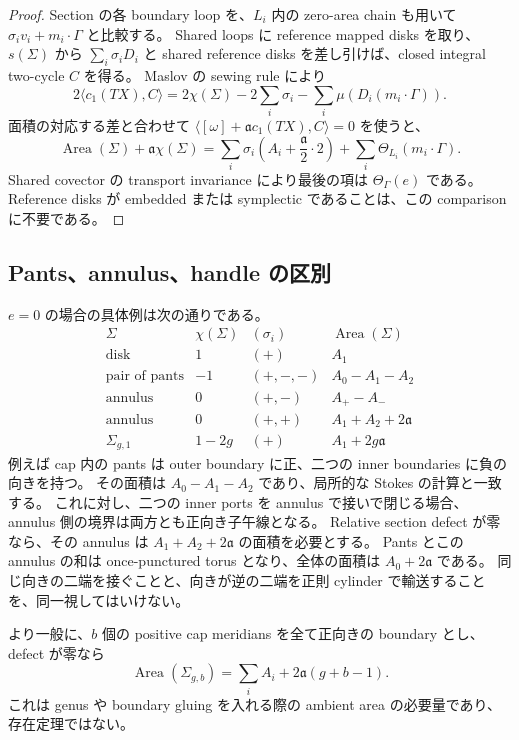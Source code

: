 \begin{proof}
Section の各 boundary loop を、$L_i$ 内の zero-area chain も用いて
$\sigma_i v_i+m_i\cdot\Gamma$ と比較する。
Shared loops に reference mapped disks を取り、$s(\Sigma)$ から
$\sum_i\sigma_iD_i$ と shared reference disks を差し引けば、closed integral two-cycle $C$ を得る。
Maslov の sewing rule により
\[
 2\langle c_1(TX),C\rangle
 =2\chi(\Sigma)-2\sum_i\sigma_i-\sum_i\mu(D_i(m_i\cdot\Gamma)).
\]
面積の対応する差と合わせて
$\langle[\omega]+\mathfrak a c_1(TX),C\rangle=0$ を使うと、
\[
 \operatorname{Area}(\Sigma)+\mathfrak a\chi(\Sigma)
 =\sum_i\sigma_i\left(A_i+\frac{\mathfrak a}{2}\cdot2\right)
  +\sum_i\Theta_{L_i}(m_i\cdot\Gamma).
\]
Shared covector の transport invariance により最後の項は $\Theta_\Gamma(e)$ である。
Reference disks が embedded または symplectic であることは、この comparison に不要である。
\end{proof}

\subsection{Pants、annulus、handle の区別}

$e=0$ の場合の具体例は次の通りである。
\[
\begin{array}{c|c|c|c}
 \Sigma&\chi(\Sigma)&(\sigma_i)&\operatorname{Area}(\Sigma)\\\hline
 \text{disk}&1&(+) &A_1\\
 \text{pair of pants}&-1 &(+,-,-)&A_0-A_1-A_2\\
 \text{annulus}&0 &(+,-)&A_+-A_-\\
 \text{annulus}&0 &(+,+)&A_1+A_2+2\mathfrak a\\
 \Sigma_{g,1}&1-2g &(+)&A_1+2g\mathfrak a
\end{array}
\]
例えば cap 内の pants は outer boundary に正、二つの inner boundaries に負の向きを持つ。
その面積は $A_0-A_1-A_2$ であり、局所的な Stokes の計算と一致する。
これに対し、二つの inner ports を annulus で接いで閉じる場合、
annulus 側の境界は両方とも正向き子午線となる。
Relative section defect が零なら、その annulus は $A_1+A_2+2\mathfrak a$ の面積を必要とする。
Pants とこの annulus の和は once-punctured torus となり、全体の面積は $A_0+2\mathfrak a$ である。
同じ向きの二端を接ぐことと、向きが逆の二端を正則 cylinder で輸送することを、同一視してはいけない。

より一般に、$b$ 個の positive cap meridians を全て正向きの boundary とし、
defect が零なら
\begin{equation}\label{rsb:all-positive}
 \operatorname{Area}(\Sigma_{g,b})=\sum_i A_i+2\mathfrak a(g+b-1).
\end{equation}
これは genus や boundary gluing を入れる際の ambient area の必要量であり、存在定理ではない。

